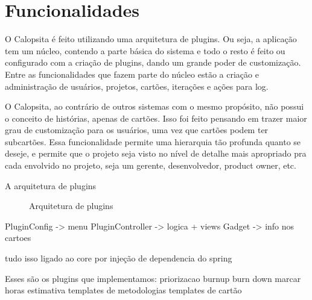 \section{Funcionalidades}

O Calopsita é feito utilizando uma arquitetura de plugins. Ou seja, a aplicação tem um núcleo, contendo a parte básica do sistema e todo o resto é feito ou configurado com a criação de plugins, dando um grande poder de customização.
Entre as funcionalidades que fazem parte do núcleo estão a criação e administração de usuários,
projetos, cartões, iterações e ações para log.

O Calopsita, ao contrário de outros sistemas com o mesmo propósito, não possui o conceito de histórias, apenas de cartões. Isso foi feito pensando em trazer maior grau de customização para os usuários, uma vez que cartões podem ter subcartões. Essa funcionalidade permite uma hierarquia tão profunda quanto se deseje, e permite que o projeto seja visto no nível de detalhe mais apropriado pra cada envolvido no projeto, seja um gerente, desenvolvedor, product owner, etc.

A arquitetura de plugins

\begin{figure}[htbp]
  \centering
  \caption{Arquitetura de plugins}
\end{figure}

PluginConfig -> menu
PluginController -> logica + views
Gadget -> info nos cartoes

tudo isso ligado ao core por injeção de dependencia do spring


Esses são os plugins que implementamos:
priorizacao
burnup
burn down
marcar horas
estimativa
templates de metodologias
templates de cartão


